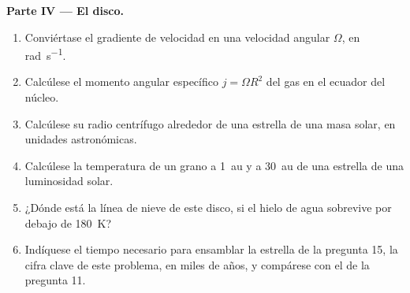\begin{problem}
\noindent\textbf{Parte IV --- El disco.}
\begin{enumerate}[resume]
  \item Conviértase el gradiente de velocidad en una velocidad angular $\Omega$, en
        \unit{rad.s^{-1}}.
  \item Calcúlese el momento angular específico $j = \Omega R^2$ del gas en el
        ecuador del núcleo.
  \item Calcúlese su radio centrífugo alrededor de una estrella de una masa solar, en
        unidades astronómicas.
  \item Calcúlese la temperatura de un grano a \qty{1}{au} y a \qty{30}{au}
        de una estrella de una luminosidad solar.
  \item ¿Dónde está la línea de nieve de este disco, si el hielo de agua sobrevive por debajo de
        \qty{180}{K}?
  \item Indíquese el tiempo necesario para ensamblar la estrella de la pregunta 15, la cifra
        clave de este problema, en miles de años, y compárese con el
         de la pregunta 11.
\end{enumerate}
\end{problem}
